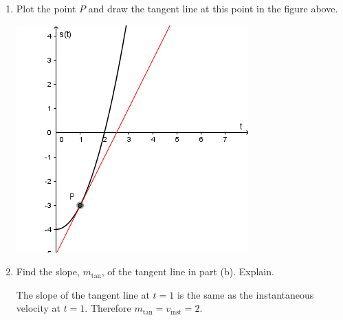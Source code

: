 \documentclass[nooutcomes]{ximera}
\begin{document}
\begin{problem}
\begin{enumerate}
\begin{enumerate}
\item
Plot the point $P$ and draw the tangent line at this point in the figure above.
\begin{freeResponse} \hfil
\begin{image}
\includegraphics[scale = .7]{Figure11.png}
\end{image}
\end{freeResponse}


\item
Find the slope, $m_{\mathrm{tan}}$, of the tangent line in part (b).
Explain.
\begin{freeResponse}
The slope of the tangent line at $t = 1$ is the same as the instantaneous velocity at $t = 1$.
Therefore $m_{\mathrm{tan}} = v_{\mathrm{inst}} = 2$.
\end{freeResponse}
\end{enumerate}


\end{enumerate}
\end{problem} 
	
	
	
	
	
	
	

	










								
				
				
	
\end{document}
